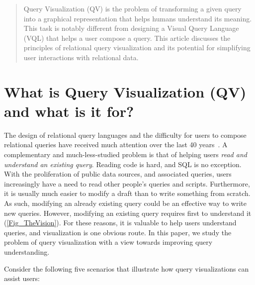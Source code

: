 \documentclass[letterpaper,11pt]{article}
\begin{document}
\begin{abstract}
Query Visualization (QV) is the problem of transforming a given query into a graphical representation
that helps humans understand its meaning.
This task is notably different from designing a Visual Query Language (VQL)
that helps a user compose a query.
This article discusses 
the principles of relational query visualization
and its potential for simplifying user interactions with relational data.



\end{abstract}





\section{What is Query Visualization (QV) and what is it for?} 
\label{sec:1}



%
%
%
%
%
%
%

The design of relational query languages and the difficulty for users to compose relational queries have
received much attention over the 
last 40 years~\cite{DBLP:journals/vlc/CatarciCLB97, 
ChanUserDatabaseInterface:1993,
GREENE1990303,
Harel:Nonprocedural:1985,
FrameworkForChoosingQueryLanguages:1985,
LEGGETT1984493,
DBLP:journals/csur/Reisner81, 
Reisner1975:HumanFactors,
Welty-Stemple:1981,
scamell:1993}.
A complementary and much-less-studied problem is that of helping users 
\emph{read and understand an existing query}.  
Reading code is hard, and SQL is no exception.  
With the proliferation of public data sources, and associated queries, users increasingly have a need to read other people's queries and scripts.  
Furthermore, it is usually much easier to modify a draft than to write something from scratch.  
As such, modifying an already existing query could be an effective way to write new queries.
However, modifying an existing query requires first to understand it (\autoref{Fig_TheVision}). 
For these reasons, it is valuable to help users understand queries,
and visualization is one obvious route.
In this paper, we study the problem of query visualization with a view towards improving query understanding.


Consider the following five scenarios that illustrate how query visualizations can assist users:
\end{document}
